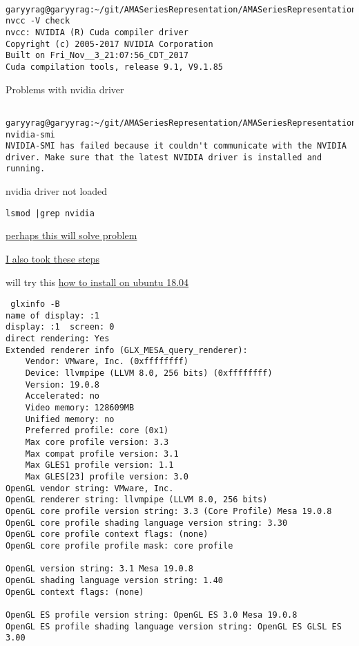 \documentclass[hyperref]{labbook}
\begin{document}
\begin{verbatim}
 
garyyrag@garyyrag:~/git/AMASeriesRepresentation/AMASeriesRepresentation$ nvcc -V check
nvcc: NVIDIA (R) Cuda compiler driver
Copyright (c) 2005-2017 NVIDIA Corporation
Built on Fri_Nov__3_21:07:56_CDT_2017
Cuda compilation tools, release 9.1, V9.1.85
\end{verbatim}

Problems with nvidia driver
\begin{verbatim}

garyyrag@garyyrag:~/git/AMASeriesRepresentation/AMASeriesRepresentation$ nvidia-smi
NVIDIA-SMI has failed because it couldn't communicate with the NVIDIA driver. Make sure that the latest NVIDIA driver is installed and running.

\end{verbatim}

nvidia driver  not loaded

\begin{verbatim}
lsmod |grep nvidia
\end{verbatim}

\href{https://askubuntu.com/questions/1048274/ubuntu-18-04-stopped-working-with-nvidia-drivers}{perhaps this will solve problem}


\href{https://devtalk.nvidia.com/default/topic/1047416/linux/nvidia-driver-is-not-loaded-ubuntu-18-10-/}{I also took these steps}

will try this
\href{https://askubuntu.com/questions/61396/how-do-i-install-the-nvidia-drivers}{how to install on ubuntu 18.04}

\begin{verbatim}
 glxinfo -B
name of display: :1
display: :1  screen: 0
direct rendering: Yes
Extended renderer info (GLX_MESA_query_renderer):
    Vendor: VMware, Inc. (0xffffffff)
    Device: llvmpipe (LLVM 8.0, 256 bits) (0xffffffff)
    Version: 19.0.8
    Accelerated: no
    Video memory: 128609MB
    Unified memory: no
    Preferred profile: core (0x1)
    Max core profile version: 3.3
    Max compat profile version: 3.1
    Max GLES1 profile version: 1.1
    Max GLES[23] profile version: 3.0
OpenGL vendor string: VMware, Inc.
OpenGL renderer string: llvmpipe (LLVM 8.0, 256 bits)
OpenGL core profile version string: 3.3 (Core Profile) Mesa 19.0.8
OpenGL core profile shading language version string: 3.30
OpenGL core profile context flags: (none)
OpenGL core profile profile mask: core profile

OpenGL version string: 3.1 Mesa 19.0.8
OpenGL shading language version string: 1.40
OpenGL context flags: (none)

OpenGL ES profile version string: OpenGL ES 3.0 Mesa 19.0.8
OpenGL ES profile shading language version string: OpenGL ES GLSL ES 3.00

\end{verbatim}
\end{document}
